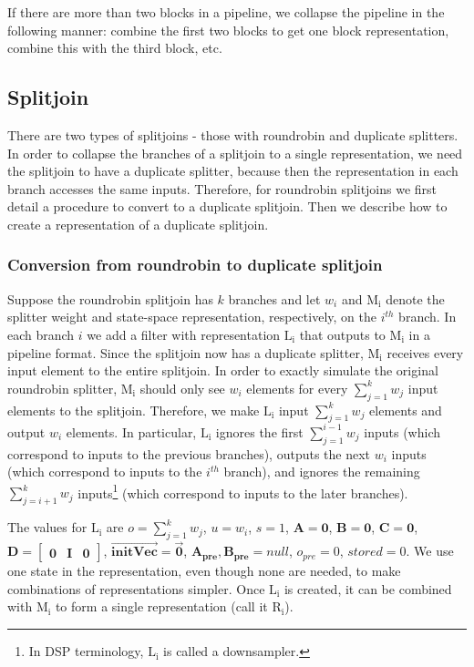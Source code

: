     If there are more than two blocks in a pipeline, we collapse
the pipeline in the following manner: combine the first two blocks
to get one block representation, combine this with the third
block, etc.

\subsection{Splitjoin}

    There are two types of splitjoins - those with roundrobin and
duplicate splitters. In order to collapse the branches of a
splitjoin to a single representation, we need the splitjoin to
have a duplicate splitter, because then the representation in each
branch accesses the same inputs. Therefore, for roundrobin
splitjoins we first detail a procedure to convert to a duplicate
splitjoin. Then we describe how to create a representation of a
duplicate splitjoin.

\subsubsection{Conversion from roundrobin to duplicate splitjoin}

    Suppose the roundrobin splitjoin has $k$ branches and let $w_i$ and
$\mathrm{M_i}$ denote the splitter weight and state-space
representation, respectively, on the $i^{th}$ branch. In each
branch $i$ we add a filter with representation $\mathrm{L_i}$ that
outputs to $\mathrm{M_i}$ in a pipeline format. Since the
splitjoin now has a duplicate splitter, $\mathrm{M_i}$ receives
every input element to the entire splitjoin. In order to exactly
simulate the original roundrobin splitter, $\mathrm{M_i}$ should
only see $w_i$ elements for every $\sum_{j=1}^{k} w_j$ input
elements to the splitjoin. Therefore, we make $\mathrm{L_i}$ input
$\sum_{j=1}^{k} w_j$ elements and output $w_i$ elements. In
particular, $\mathrm{L_i}$ ignores the first $\sum_{j=1}^{i-1}
w_j$ inputs (which correspond to inputs to the previous branches),
outputs the next $w_i$ inputs (which correspond to inputs to the
$i^{th}$ branch), and ignores the remaining $\sum_{j=i+1}^{k} w_j$
inputs\footnote{In DSP terminology, $\mathrm{L_i}$ is called a
downsampler.} (which correspond to inputs to the later branches).

    The values for $\mathrm{L_i}$ are $o = \sum_{j=1}^{k} w_j$, $u = w_i$,
$s = 1$, $\mathbf{A} = \mathbf{0}$, $\mathbf{B} = \mathbf{0}$,
$\mathbf{C} = \mathbf{0}$, $\mathbf{D} = \left [ \begin{array}
{ccc} \mathbf{0} & \mathbf{I} & \mathbf{0} \end{array} \right ]$,
$\overrightarrow{\mathbf{initVec}} = \vec{\mathbf{0}}$,
$\mathbf{A_{pre}}, \mathbf{B_{pre}} = null$, $o_{pre} = 0$,
$stored = 0$. We use one state in the representation, even though
none are needed, to make combinations of representations simpler.
Once $\mathrm{L_i}$ is created, it can be combined with
$\mathrm{M_i}$ to form a single representation (call it
$\mathrm{R_i}$).

